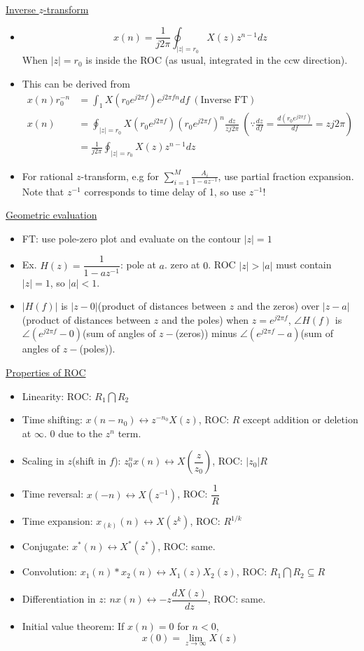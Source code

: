 \documentclass{article}
\begin{document}
\underline{Inverse $z$-transform}
\begin{itemize}
    \item \[x(n)=\frac{1}{j2\pi}\oint_{|z|=r_0}X(z)z^{n-1}dz\]
    When $|z|=r_0$ is inside the ROC (as usual, integrated in the ccw direction).
    \item This can be derived from 
    \begin{align*}
        x(n)r_0^{-n}&=\int_1 X(r_0e^{j2\pi f})e^{j2\pi fn}df\:(\text{Inverse FT})\\
        x(n)&=\oint_{|z|=r_0} X(r_0e^{j2\pi f})(r_0e^{j2\pi f})^n \frac{dz}{zj2\pi}\:(\because\frac{dz}{df}=\frac{d(r_0e^{j2\pi f})}{df}=zj2\pi)\\
            &=\frac{1}{j2\pi}\oint_{|z|=r_0}X(z)z^{n-1}dz
    \end{align*}
    \item For rational $z$-transform, e.g for $\sum_{i=1}^{M}\frac{A_i}{1-az^{-1}}$, use partial fraction expansion. Note that $z^{-1}$ corresponds to time delay of 1, so use $z^{-1}$!
\end{itemize}
\underline{Geometric evaluation}
\begin{itemize}
    \item FT: use pole-zero plot and evaluate on the contour $|z|=1$
    \item Ex. $H(z)=\dfrac{1}{1-az^{-1}}$: pole at $a$. zero at $0$. ROC $|z|>|a|$ must contain $|z|=1$, so $|a|<1$.
    \item $|H(f)|$ is $|z-0|$(product of distances between $z$ and the zeros) over $|z-a|$(product of distances between $z$ and the poles) when $z=e^{j2\pi f}$, $\angle H(f)$ is $\angle(e^{j2\pi f}-0)$(sum of angles of $z-$(zeros)) minus $\angle(e^{j2\pi f}-a)$(sum of angles of $z-$(poles)).
\end{itemize}
\underline{Properties of ROC}
\begin{itemize}
\item Linearity: ROC: $R_1\bigcap R_2$
\item Time shifting: $x(n-n_0)\leftrightarrow z^{-n_0}X(z)$, ROC: $R$ except addition or deletion at $\infty$. $0$ due to the $z^n$ term.
\item Scaling in $z$(shift in $f$): $z_0^nx(n)\leftrightarrow X\left(\dfrac{z}{z_0}\right)$, ROC: $|z_0|R$
\item Time reversal: $x(-n)\leftrightarrow X(z^{-1})$, ROC: $\dfrac{1}{R}$
\item Time expansion: $x_{(k)}(n)\leftrightarrow X(z^k)$, ROC: $R^{1/k}$
\item Conjugate: $x^*(n)\leftrightarrow X^*(z^*)$, ROC: same.
\item Convolution: $x_1(n)*x_2(n)\leftrightarrow X_1(z)X_2(z)$, ROC: $R_1\bigcap R_2\subseteq R$
\item Differentiation in $z$: $nx(n)\leftrightarrow -z\dfrac{dX(z)}{dz}$, ROC: same.
\item Initial value theorem: If $x(n)=0$ for $n<0$,
\[x(0)=\lim_{z\rightarrow\infty}X(z)\]
\end{itemize}
\end{document}
